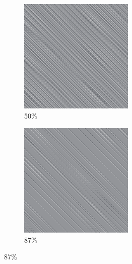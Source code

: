 \documentclass[12pt, fleqn]{report}                             %
\theoremstyle{break}                                            %
\begin{document}
\begin{figure}[ht!]
\begin{subfigure}[b]{0.4\linewidth}
          \includegraphics[width=0.6\textwidth]{Images/15/c.png}
          \caption{50\%}
        \end{subfigure}
        \begin{subfigure}[b]{0.4\linewidth}
          \includegraphics[width=0.6\textwidth]{Images/15/d.png}
          \caption{87\%}
        \end{subfigure}
      \end{figure}
\end{document}
